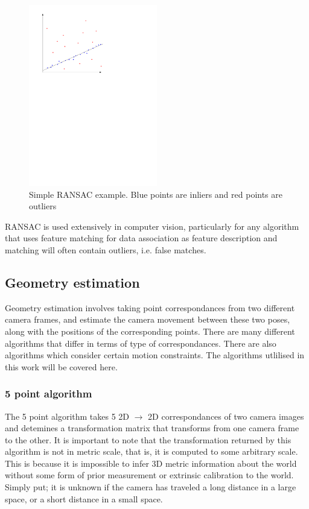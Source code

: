\begin{figure}[h]
  \centering
    \includegraphics[width=0.5\textwidth]{chapters/images/ransac}
  \caption{Simple RANSAC example.  Blue points are inliers and red points are outliers}
  \label{fig:RANSAC}
\end{figure}

RANSAC is used extensively in computer vision, particularly for any algorithm that uses feature matching for data association as feature description and matching will often contain outliers, i.e. false matches.

\subsection{Geometry estimation}

Geometry estimation involves taking point correspondances from two different camera frames, and estimate the camera movement between these two poses, along with the positions of the corresponding points.  There are many different algorithms that differ in terms of type of correspondances.  There are also algorithms which consider certain motion constraints.  The algorithms utlilised in this work will be covered here.

\subsubsection{5 point algorithm}
\label{subsec:5point}

The 5 point algorithm takes 5 2D $\rightarrow$ 2D correspondances of two camera images and detemines a transformation matrix that transforms from one camera frame to the other. It is important to note that the transformation returned by this algorithm is not in metric scale, that is, it is computed to some arbitrary scale.  This is because it is impossible to infer 3D metric information about the world without some form of prior measurement or extrinsic calibration to the world.  Simply put; it is unknown if the camera has traveled a long distance in a large space, or a short distance in a small space.

